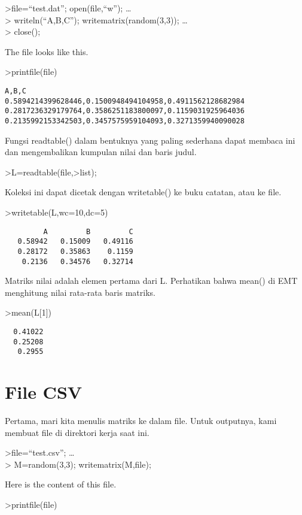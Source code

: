 \documentclass[
]{book}
\begin{document}
\textgreater file=``test.dat''; open(file,``w''); \ldots{}\\
\textgreater{} writeln(``A,B,C''); writematrix(random(3,3)); \ldots{}\\
\textgreater{} close();

The file looks like this.

\textgreater printfile(file)

\begin{verbatim}
A,B,C
0.5894214399628446,0.1500948494104958,0.4911562128682984
0.2817236329179764,0.3586251183800097,0.1159031925964036
0.2135992153342503,0.3457575959104093,0.3271359940090028
\end{verbatim}

Fungsi readtable() dalam bentuknya yang paling sederhana dapat membaca ini dan mengembalikan kumpulan nilai dan baris judul.

\textgreater L=readtable(file,\textgreater list);

Koleksi ini dapat dicetak dengan writetable() ke buku catatan, atau ke file.

\textgreater writetable(L,wc=10,dc=5)

\begin{verbatim}
         A         B         C
   0.58942   0.15009   0.49116
   0.28172   0.35863    0.1159
    0.2136   0.34576   0.32714
\end{verbatim}

Matriks nilai adalah elemen pertama dari L. Perhatikan bahwa mean() di EMT menghitung nilai rata-rata baris matriks.

\textgreater mean(L{[}1{]})

\begin{verbatim}
  0.41022 
  0.25208 
   0.2955 
\end{verbatim}

\chapter{File CSV}\label{file-csv}

Pertama, mari kita menulis matriks ke dalam file. Untuk outputnya, kami membuat file di direktori kerja saat ini.

\textgreater file=``test.csv''; \ldots{}\\
\textgreater{} M=random(3,3); writematrix(M,file);

Here is the content of this file.

\textgreater printfile(file)
\end{document}
